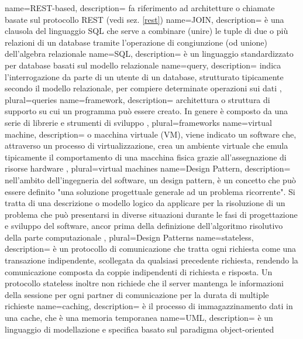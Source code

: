  {
	name=REST-based,
	description={ fa riferimento ad architetture o chiamate  basate sul protocollo REST (vedi sez. \ref{rest})
	}
}
 {
	name=JOIN,
	description={  è una clausola del linguaggio SQL che serve a combinare (unire) le tuple di due o più relazioni di un database tramite l'operazione di congiunzione (od unione) dell'algebra relazionale
	}
}
 {
	name=SQL,
	description={ è un linguaggio standardizzato per database basati sul modello relazionale
	}
}
 {
	name=query,
	description={ indica l'interrogazione da parte di un utente di un database, strutturato tipicamente secondo il modello relazionale, per compiere determinate operazioni sui dati
	},
	plural=queries
}
 {
	name=framework,
	description={  architettura o struttura di supporto su cui un programma può essere creato. In genere è composto da una serie di librerie e strumenti di sviluppo
	},
	plural=frameworks
}
 {
	name=virtual machine,
	description={ o macchina virtuale (VM), viene indicato un software che, attraverso un processo di virtualizzazione, crea un ambiente virtuale che emula tipicamente il comportamento di una macchina fisica grazie all'assegnazione di risorse hardware
	},
	plural=virtual machines
}
 {
	name=Design Pattern,
	description={ nell'ambito dell'ingegneria del software, un design pattern, è un concetto che può essere definito "una soluzione progettuale generale ad un problema ricorrente". Si tratta di una descrizione o modello logico da applicare per la risoluzione di un problema che può presentarsi in diverse situazioni durante le fasi di progettazione e sviluppo del software, ancor prima della definizione dell'algoritmo risolutivo della parte computazionale
	},
	plural=Design Patterns
}
 {
	name=stateless,
	description={ è un protocollo di comunicazione che tratta ogni richiesta come una transazione indipendente, scollegata da qualsiasi precedente richiesta, rendendo la comunicazione composta da coppie indipendenti di richiesta e risposta. Un protocollo stateless inoltre non richiede che il server mantenga le informazioni della sessione per ogni partner di comunicazione per la durata di multiple richieste
	}
}
 {
	name=caching,
	description={ è il processo di immagazzinamento dati in una cache, che è una memoria temporanea
	}
}
 {
	name=UML,
	description={ è un linguaggio di modellazione e specifica basato sul paradigma object-oriented
	}
}
